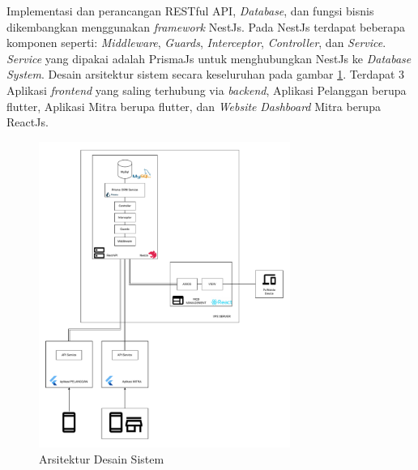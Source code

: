 Implementasi dan perancangan RESTful API, \textit{Database}, dan fungsi bisnis dikembangkan menggunakan \textit{framework} NestJs. Pada NestJs terdapat beberapa komponen seperti: \textit{Middleware}, \textit{Guards}, \textit{Interceptor}, \textit{Controller}, dan \textit{Service}. \textit{Service} yang dipakai adalah PrismaJs untuk menghubungkan NestJs ke \textit{Database System}. Desain arsitektur sistem secara keseluruhan pada gambar \ref{sistem-desain-arsitektur}. Terdapat 3 Aplikasi \textit{frontend} yang saling terhubung via \textit{backend}, Aplikasi Pelanggan berupa flutter, Aplikasi Mitra berupa flutter, dan \textit{Website} \textit{Dashboard} Mitra berupa ReactJs.
\begin{figure}[h]
  \centering
  \includegraphics[width=0.73\textwidth]{drawio/System-Design-Architecture.drawio.pdf}
  \caption{Arsitektur Desain Sistem}
  \label{sistem-desain-arsitektur}
\end{figure}
\newpage
